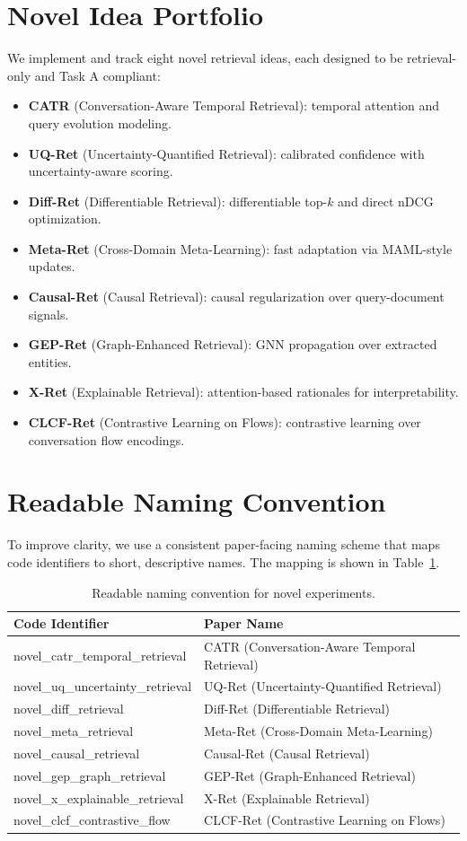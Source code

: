 \documentclass[conference]{IEEEtran}
\begin{document}
\section{Novel Idea Portfolio}
We implement and track eight novel retrieval ideas, each designed to be retrieval-only and Task A compliant:
\begin{itemize}
    \item \textbf{CATR} (Conversation-Aware Temporal Retrieval): temporal attention and query evolution modeling.
    \item \textbf{UQ-Ret} (Uncertainty-Quantified Retrieval): calibrated confidence with uncertainty-aware scoring.
    \item \textbf{Diff-Ret} (Differentiable Retrieval): differentiable top-$k$ and direct nDCG optimization.
    \item \textbf{Meta-Ret} (Cross-Domain Meta-Learning): fast adaptation via MAML-style updates.
    \item \textbf{Causal-Ret} (Causal Retrieval): causal regularization over query-document signals.
    \item \textbf{GEP-Ret} (Graph-Enhanced Retrieval): GNN propagation over extracted entities.
    \item \textbf{X-Ret} (Explainable Retrieval): attention-based rationales for interpretability.
    \item \textbf{CLCF-Ret} (Contrastive Learning on Flows): contrastive learning over conversation flow encodings.
\end{itemize}

\section{Readable Naming Convention}
To improve clarity, we use a consistent paper-facing naming scheme that maps code identifiers to short, descriptive names. The mapping is shown in Table~\ref{tab:naming}.

\begin{table}[!t]
\centering
\small
\begin{tabular}{ll}
\toprule
\textbf{Code Identifier} & \textbf{Paper Name} \\
\midrule
novel\_catr\_temporal\_retrieval & CATR (Conversation-Aware Temporal Retrieval) \\
novel\_uq\_uncertainty\_retrieval & UQ-Ret (Uncertainty-Quantified Retrieval) \\
novel\_diff\_retrieval & Diff-Ret (Differentiable Retrieval) \\
novel\_meta\_retrieval & Meta-Ret (Cross-Domain Meta-Learning) \\
novel\_causal\_retrieval & Causal-Ret (Causal Retrieval) \\
novel\_gep\_graph\_retrieval & GEP-Ret (Graph-Enhanced Retrieval) \\
novel\_x\_explainable\_retrieval & X-Ret (Explainable Retrieval) \\
novel\_clcf\_contrastive\_flow & CLCF-Ret (Contrastive Learning on Flows) \\
\bottomrule
\end{tabular}
\caption{Readable naming convention for novel experiments.}
\label{tab:naming}
\end{table}
\end{document}
